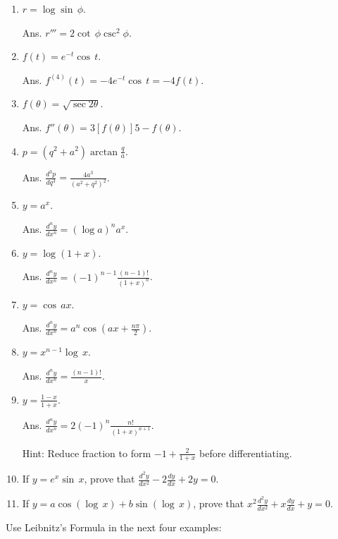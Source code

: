 \begin{enumerate}
\item
$r = \log\sin\, \phi$.  	

Ans.	
$r''' = 2\cot\,\phi \csc^2\phi$.

\item
$f(t) = e^{-t}\cos\, t$.  	

Ans.
$f^{(4)}(t) = - 4e^{- t}\cos\, t = - 4f(t)$.

\item
$f(\theta) = \sqrt{\sec 2\theta}$.  	

Ans.	
$f''(\theta) = 3[f(\theta)]5 - f(\theta)$.

\item
$p = (q^2 + a^2) \arctan \frac{q}{a}$.  	

Ans.	
$\frac{d^3 p}{dq^3} = \frac{4a^3}{(a^2 + q^2)^2}$.

\item
$y = a^x$.  	

Ans.	
$\frac{d^n y}{dx^n} = (\log a)^n a^x$.

\item
$y = \log(1 + x)$.  	

Ans.	
$\frac{d^n y}{dx^n} = (-1)^{n - 1} \frac{(n - 1)!}{(1 + x)^n}$.

\item
$y = \cos\, ax$. 	

Ans.
$\frac{d^n y}{dx^n} = a^n \cos \left ( ax + \frac{n\pi}{2} \right )$.

\item
$y = x^{n- 1}\log\, x$.  	

Ans.
$\frac{d^n y}{dx^n} = \frac{(n - 1)!}{x}$.

\item
$y = \frac{1 - x}{1 + x}$.  	

Ans.	
$\frac{d^n y}{dx^n} = 2 (-1)^n \frac{n!}{(1 + x)^{n + 1}}$.

Hint: Reduce fraction to form $-1 + \frac{2}{1 + x}$ before differentiating.

\item
If $y = e^x\sin\, x$, prove that 
$\frac{d^2 y}{dx^2} - 2 \frac{dy}{dx} + 2y = 0$.

\item
If $y = a\cos(\log\, x) + b\sin(\log\, x)$, prove that 
$x^2 \frac{d^2 y}{dx^2} + x \frac{dy}{dx} + y = 0$.
\end{enumerate}

Use Leibnitz's Formula in the next four examples:

